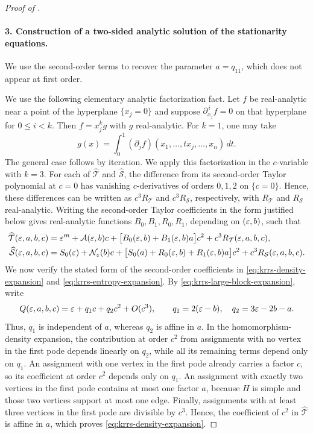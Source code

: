 \begin{proof}[Proof of ]
\paragraph{3. Construction of a two-sided analytic solution of the
stationarity equations.}
We use the second-order terms to recover the parameter \(a=q_{11}\),
which does not appear at first order.

We use the following elementary analytic factorization fact.  Let \(f\) be
real-analytic near a point of the hyperplane \(\{x_j=0\}\) and suppose
\(\partial_{x_j}^{\,i}f=0\) on that hyperplane for \(0\le i<k\).  Then
\(f=x_j^{k}g\) with \(g\) real-analytic.  For \(k=1\), one may take
\[
  g(x)=\int_0^1
    (\partial_jf)(x_1,\dots,tx_j,\dots,x_n)\,dt.
\]
The general case follows by iteration.  We apply this factorization in the
\(c\)-variable with \(k=3\).  For each of \(\widehat{\mathcal T}\) and
\(\widehat{\mathcal S}\), the difference from its second-order Taylor
polynomial at \(c=0\) has vanishing \(c\)-derivatives of orders \(0,1,2\) on
\(\{c=0\}\).  Hence, these differences can be written as
\(c^3R_{\mathcal T}\) and \(c^3R_{\mathcal S}\), respectively, with
\(R_{\mathcal T}\) and \(R_{\mathcal S}\) real-analytic.  Writing the
second-order Taylor coefficients in the form justified below gives
real-analytic functions \(B_0,B_1,R_0,R_1\), depending on \((\varepsilon,b)\), such
that
\begin{align}
  \widehat{\mathcal T}(\varepsilon,a,b,c)
  &=\varepsilon^m+\mathcal A(\varepsilon,b)c
    +\bigl[B_0(\varepsilon,b)+B_1(\varepsilon,b)a\bigr]c^2
    +c^3R_{\mathcal T}(\varepsilon,a,b,c),
    \label{eq:krrs-density-expansion}\\
  \widehat{\mathcal S}(\varepsilon,a,b,c)
  &=S_0(\varepsilon)+\mathcal N_\varepsilon(b)c
    +\bigl[S_0(a)+R_0(\varepsilon,b)+R_1(\varepsilon,b)a\bigr]c^2
    +c^3R_{\mathcal S}(\varepsilon,a,b,c).
    \label{eq:krrs-entropy-expansion}
\end{align}
We now verify the stated form of the second-order coefficients in
\eqref{eq:krrs-density-expansion} and \eqref{eq:krrs-entropy-expansion}.  By
\eqref{eq:krrs-large-block-expansion}, write
\[
  Q(\varepsilon,a,b,c)=\varepsilon+q_1c+q_2c^2+O(c^3),
  \qquad q_1=2(\varepsilon-b),\quad q_2=3\varepsilon-2b-a.
\]
Thus, \(q_1\) is independent of \(a\), whereas \(q_2\) is affine in \(a\).
In the homomorphism-density expansion, the contribution at order \(c^2\)
from assignments with no vertex in the first pode depends linearly on
\(q_2\), while all its remaining terms depend only on \(q_1\).  An assignment
with one vertex in the first pode already carries a factor \(c\), so its
coefficient at order \(c^2\) depends only on \(q_1\).  An assignment with
exactly two vertices in the first pode contains at most one factor \(a\),
because \(H\) is simple and those two vertices support at most one edge.
Finally, assignments with at least three vertices in the first pode are
divisible by \(c^3\).  Hence, the coefficient of \(c^2\) in
\(\widehat{\mathcal T}\) is affine in \(a\), which proves
\eqref{eq:krrs-density-expansion}.


\end{proof}
